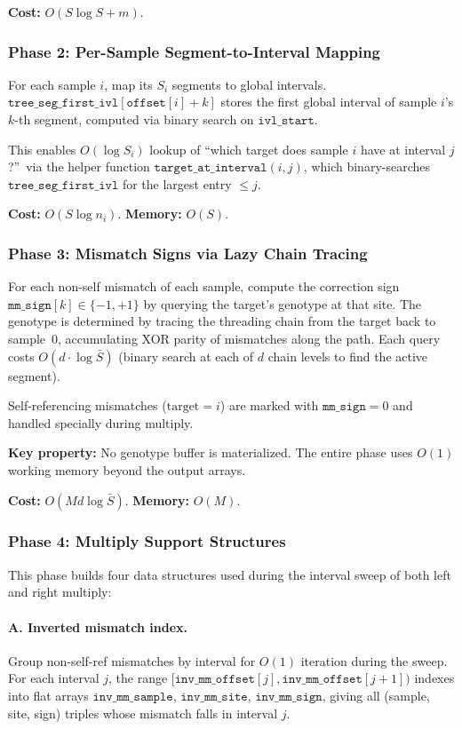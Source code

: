 \documentclass[11pt]{article}
\begin{document}
\textbf{Cost:} $O(S \log S + m)$.

\subsubsection{Phase 2: Per-Sample Segment-to-Interval Mapping}

For each sample $i$, map its $S_i$ segments to global intervals.
$\texttt{tree\_seg\_first\_ivl}[\texttt{offset}[i] + k]$ stores the first
global interval of sample $i$'s $k$-th segment, computed via binary search
on $\texttt{ivl\_start}$.

This enables $O(\log S_i)$ lookup of ``which target does sample $i$ have
at interval $j$?''\ via the helper function
$\texttt{target\_at\_interval}(i, j)$, which binary-searches
$\texttt{tree\_seg\_first\_ivl}$ for the largest entry $\le j$.

\textbf{Cost:} $O(S \log n_i)$.  \textbf{Memory:} $O(S)$.

\subsubsection{Phase 3: Mismatch Signs via Lazy Chain Tracing}

For each non-self mismatch of each sample, compute the correction sign
$\texttt{mm\_sign}[k] \in \{-1, +1\}$ by querying the target's genotype at
that site.  The genotype is determined by tracing the threading chain from
the target back to sample~0, accumulating XOR parity of mismatches along
the path.  Each query costs $O(d \cdot \log \bar{S})$ (binary search at
each of $d$ chain levels to find the active segment).

Self-referencing mismatches ($\text{target} = i$) are marked with
$\texttt{mm\_sign} = 0$ and handled specially during multiply.

\textbf{Key property:} No genotype buffer is materialized.  The entire
phase uses $O(1)$ working memory beyond the output arrays.

\textbf{Cost:} $O(Md \log \bar{S})$.  \textbf{Memory:} $O(M)$.

\subsubsection{Phase 4: Multiply Support Structures}

This phase builds four data structures used during the interval sweep of
both left and right multiply:

\paragraph{A. Inverted mismatch index.}
Group non-self-ref mismatches by interval for $O(1)$ iteration during the
sweep.  For each interval $j$, the range
$[\texttt{inv\_mm\_offset}[j], \texttt{inv\_mm\_offset}[j{+}1])$ indexes
into flat arrays $\texttt{inv\_mm\_sample}$, $\texttt{inv\_mm\_site}$,
$\texttt{inv\_mm\_sign}$, giving all (sample, site, sign) triples whose
mismatch falls in interval $j$.
\end{document}
